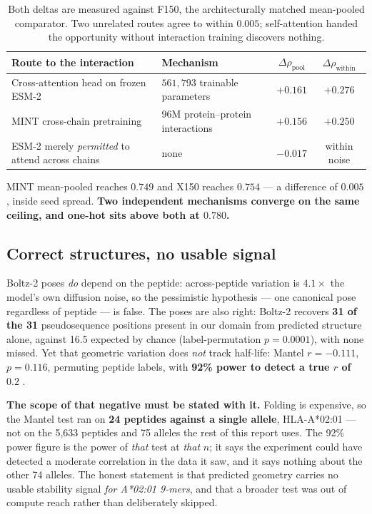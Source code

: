 \documentclass[11pt,a4paper]{article}
\newcommand{\rhop}{\rho_{\text{pool}}}
\newcommand{\rhow}{\rho_{\text{within}}}
\begin{document}
\begin{table}[H]
\centering\small
\begin{tabular}{@{}llcc@{}}
\toprule
\textbf{Route to the interaction} & \textbf{Mechanism} & $\Delta\rhop$ & $\Delta\rhow$ \\
\midrule
Cross-attention head on frozen ESM-2 & $561{,}793$ trainable parameters & $+0.161$ & $+0.276$ \\
MINT cross-chain pretraining & 96M protein--protein interactions & $+0.156$ & $+0.250$ \\
ESM-2 merely \emph{permitted} to attend across chains & none & $-0.017$ & within noise \\
\bottomrule
\end{tabular}
\caption{Both deltas are measured against F150, the architecturally matched mean-pooled
comparator. Two unrelated routes agree to within $0.005$; self-attention handed the opportunity
without interaction training discovers nothing.}
\label{tab:interaction}
\end{table}

MINT mean-pooled reaches $0.749$ and X150 reaches $0.754$ --- a difference of $0.005$, inside
seed spread. \textbf{Two independent mechanisms converge on the same ceiling, and one-hot sits
above both at $0.780$.}

\subsection{Correct structures, no usable signal}

Boltz-2 \citep{passaro2025boltz2} poses \emph{do} depend on the peptide: across-peptide variation
is $4.1\times$ the model's own diffusion noise, so the pessimistic hypothesis --- one canonical
pose regardless of peptide --- is false. The poses are also right: Boltz-2 recovers
\textbf{31 of the 31} pseudosequence positions present in our domain from predicted structure
alone, against 16.5 expected by chance (label-permutation $p = 0.0001$), with none missed. Yet
that geometric variation does \emph{not} track half-life: Mantel $r = -0.111$, $p = 0.116$,
permuting peptide labels, with \textbf{92\% power to detect a true $r$ of $0.2$}
\citep{mantel1967}.

\textbf{The scope of that negative must be stated with it.} Folding is expensive, so the Mantel
test ran on \textbf{24 peptides against a single allele}, HLA-A*02:01 --- not on the 5{,}633
peptides and 75 alleles the rest of this report uses. The 92\% power figure is the power of
\emph{that} test at \emph{that} $n$; it says the experiment could have detected a moderate
correlation in the data it saw, and it says nothing about the other 74 alleles. The honest
statement is that predicted geometry carries no usable stability signal \emph{for A*02:01
9-mers}, and that a broader test was out of compute reach rather than deliberately skipped.
\end{document}
